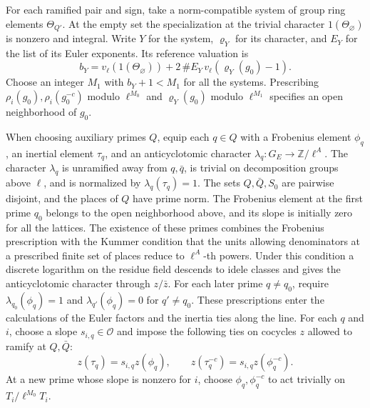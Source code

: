 For each ramified pair and sign, take a norm-compatible system of
group ring elements \(\Theta_{Q'}\). At the empty set the
specialization at the trivial character \(1(\Theta_\varnothing)\)
is nonzero and integral. Write \(Y\) for the system, \(\varrho_Y\)
for its character, and \(E_Y\) for the list of its Euler exponents.
Its reference valuation is
\[
 b_Y=v_\ell(1(\Theta_\varnothing))+
              2\,\#E_Y\,v_\ell(\varrho_Y(g_0)-1).
\]
Choose an integer \(M_1\) with \(b_Y+1<M_1\) for all the systems.
Prescribing \(\rho_i(g_0),\rho_i(g_0^{-c})\) modulo \(\ell^{M_0}\)
and \(\varrho_Y(g_0)\) modulo \(\ell^{M_1}\) specifies an open
neighborhood of \(g_0\).



When choosing auxiliary primes \(Q\), equip each \(q\in Q\) with
a Frobenius element \(\phi_q\), an inertial element \(\tau_q\), and
an anticyclotomic character \(\lambda_q\colon G_E\to\mathbb Z/\ell^A\).
The character \(\lambda_q\) is unramified away from \(q,\bar q\), is
trivial on decomposition groups above \(\ell\), and is normalized by
\(\lambda_q(\tau_q)=1\). The sets \(Q,\bar Q,S_0\) are pairwise
disjoint, and the places of \(Q\) have prime norm. The Frobenius
element at the first prime \(q_0\) belongs to the open neighborhood
above, and its slope is initially zero for all the lattices.
The existence of these primes combines the Frobenius prescription
with the Kummer condition that the units allowing denominators at
a prescribed finite set of places reduce to \(\ell^A\)-th powers.
Under this condition a discrete logarithm on the residue field
descends to idele classes and gives the anticyclotomic character
through \(z/\bar z\).
For each later prime \(q\ne q_0\), require
\(\lambda_{q_0}(\phi_q)=1\) and \(\lambda_{q'}(\phi_q)=0\)
for \(q'\ne q_0\). These prescriptions enter the calculations
of the Euler factors and the inertia ties along the line.
For each \(q\) and \(i\), choose a slope \(s_{i,q}\in\mathcal O\) and impose the
following ties on cocycles \(z\) allowed to ramify at \(Q,\bar Q\):
\[
 z(\tau_q)=s_{i,q}z(\phi_q),\qquad
 z(\tau_q^{-c})=s_{i,q}z(\phi_q^{-c}).
\]
At a new prime whose slope is nonzero for \(i\), choose
\(\phi_q,\phi_q^{-c}\) to act trivially on \(T_i/\ell^{M_0}T_i\).

